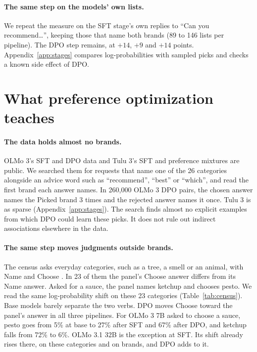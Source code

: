 \documentclass[11pt]{article}
\begin{document}
\paragraph{The same step on the models' own lists.} We repeat the measure on the SFT stage's own replies to ``Can you
recommend\ldots'', keeping those that name both brands (89 to 146 lists per pipeline). The DPO step remains, at $+14$,
$+9$ and $+14$ points. Appendix~\ref{app:stages} compares log-probabilities with sampled picks and checks a known side
effect of DPO.

\section{What preference optimization teaches}
\label{sec:general}

\paragraph{The data holds almost no brands.} OLMo 3's SFT and DPO data and Tulu 3's SFT and preference mixtures are
public. We searched them for requests that name one of the 26 categories alongside an advice word such as
``recommend'', ``best'' or ``which'', and read the first brand each answer names. In 260,000 OLMo 3 DPO pairs, the
chosen answer names the Picked brand 3 times and the rejected answer names it once. Tulu 3 is as sparse
(Appendix~\ref{app:stages}). The search finds almost no explicit examples from which DPO could learn these picks.
It does not rule out indirect associations elsewhere in the data.

\paragraph{The same step moves judgments outside brands.} The census asks everyday categories, such as a tree, a smell
or an animal, with Name and Choose \citep{parikh2026census}. In 23 of them the panel's Choose answer differs from its
Name answer. Asked for a sauce, the panel names ketchup and chooses pesto. We read the same log-probability shift on
these 23 categories (Table~\ref{tab:census}). Base models barely separate the two verbs. DPO moves Choose toward the
panel's answer in all three pipelines. For OLMo 3 7B asked to choose a sauce, pesto goes from 5\% at base to 27\% after
SFT and 67\% after DPO, and ketchup falls from 72\% to 6\%. OLMo 3.1 32B is the exception at SFT. Its shift already
rises there, on these categories and on brands, and DPO adds to it.
\end{document}
